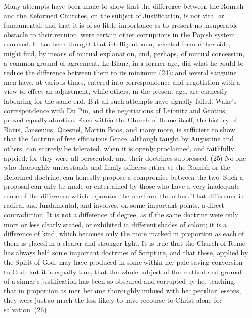 \documentclass[
]{book}
\begin{document}
Many attempts have been made to show that the difference between the Romish and the Reformed Churches, on the subject of Justification, is not vital or fundamental; and that it is of so little importance as to present no insuperable obstacle to their reunion, were certain other corruptions in the Popish system removed. It has been thought that intelligent men, selected from either side, might find, by means of mutual explanation, and, perhaps, of mutual concession, a common ground of agreement. Le Blanc, in a former age, did what he could to reduce the difference between them to its minimum (24); and several sanguine men have, at various times, entered into correspondence and negotiation with a view to effect an adjustment, while others, in the present age, are earnestly labouring for the same end. But all such attempts have signally failed. Wake's correspondence with Du Pin, and the negotiations of Leibnitz and Grotius, proved equally abortive. Even within the Church of Rome itself, the history of Baius, Jansenius, Quesnel, Martin Boos, and many more, is sufficient to show that the doctrine of free efficacious Grace, although taught by Augustine and others, can scarcely be tolerated, when it is openly proclaimed, and faithfully applied; for they were all persecuted, and their doctrines suppressed. (25) No one who thoroughly understands and firmly adheres either to the Romish or the Reformed doctrine, can honestly propose a compromise between the two. Such a proposal can only be made or entertained by those who have a very inadequate sense of the difference which separates the one from the other. That difference is radical and fundamental, and involves, on some important points, a direct contradiction. It is not a difference of degree, as if the same doctrine were only more or less clearly stated, or exhibited in different shades of colour; it is a difference of kind, which becomes only the more marked in proportion as each of them is placed in a clearer and stronger light. It is true that the Church of Rome has always held some important doctrines of Scripture, and that these, applied by the Spirit of God, may have produced in some within her pale saving conversion to God; but it is equally true, that the whole subject of the method and ground of a sinner's justification has been so obscured and corrupted by her teaching, that in proportion as men became thoroughly imbued with her peculiar lessons, they were just so much the less likely to have recourse to Christ alone for salvation. (26)
\end{document}
